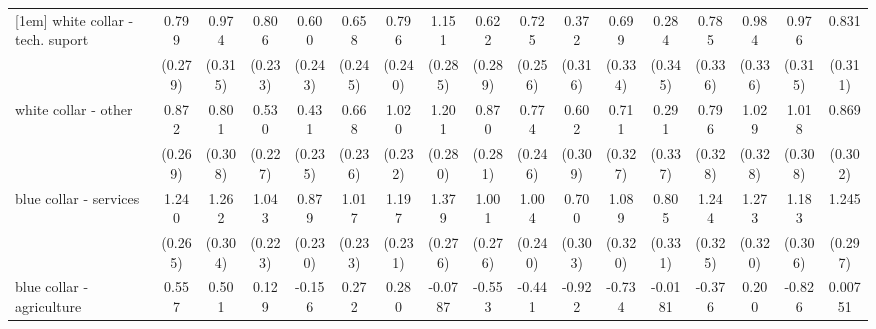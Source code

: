 {\begin{tabular}{l*{16}{c}}
[1em]
white collar - tech. suport&       0.799\sym{**} &       0.974\sym{**} &       0.806\sym{***}&       0.600\sym{*}  &       0.658\sym{**} &       0.796\sym{***}&       1.151\sym{***}&       0.622\sym{*}  &       0.725\sym{**} &       0.372         &       0.699\sym{*}  &       0.284         &       0.785\sym{*}  &       0.984\sym{**} &       0.976\sym{**} &       0.831\sym{**} \\
                    &     (0.279)         &     (0.315)         &     (0.233)         &     (0.243)         &     (0.245)         &     (0.240)         &     (0.285)         &     (0.289)         &     (0.256)         &     (0.316)         &     (0.334)         &     (0.345)         &     (0.336)         &     (0.336)         &     (0.315)         &     (0.311)         \\
[1em]
white collar - other&       0.872\sym{**} &       0.801\sym{**} &       0.530\sym{*}  &       0.431         &       0.668\sym{**} &       1.020\sym{***}&       1.201\sym{***}&       0.870\sym{**} &       0.774\sym{**} &       0.602         &       0.711\sym{*}  &       0.291         &       0.796\sym{*}  &       1.029\sym{**} &       1.018\sym{***}&       0.869\sym{**} \\
                    &     (0.269)         &     (0.308)         &     (0.227)         &     (0.235)         &     (0.236)         &     (0.232)         &     (0.280)         &     (0.281)         &     (0.246)         &     (0.309)         &     (0.327)         &     (0.337)         &     (0.328)         &     (0.328)         &     (0.308)         &     (0.302)         \\
[1em]
blue collar - services&       1.240\sym{***}&       1.262\sym{***}&       1.043\sym{***}&       0.879\sym{***}&       1.017\sym{***}&       1.197\sym{***}&       1.379\sym{***}&       1.001\sym{***}&       1.004\sym{***}&       0.700\sym{*}  &       1.089\sym{***}&       0.805\sym{*}  &       1.244\sym{***}&       1.273\sym{***}&       1.183\sym{***}&       1.245\sym{***}\\
                    &     (0.265)         &     (0.304)         &     (0.223)         &     (0.230)         &     (0.233)         &     (0.231)         &     (0.276)         &     (0.276)         &     (0.240)         &     (0.303)         &     (0.320)         &     (0.331)         &     (0.325)         &     (0.320)         &     (0.306)         &     (0.297)         \\
[1em]
blue collar - agriculture&       0.557         &       0.501         &       0.129         &      -0.156         &       0.272         &       0.280         &     -0.0787         &      -0.553         &      -0.441         &      -0.922         &      -0.734         &     -0.0181         &      -0.376         &       0.200         &      -0.826         &     0.00751         \\

\end{tabular}}
